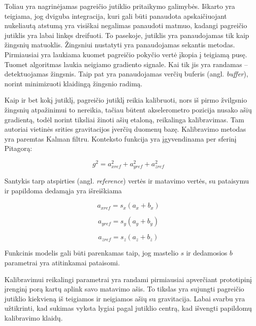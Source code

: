 Toliau yra nagrinėjamas pagreičio jutiklio pritaikymo galimybės. Iškarto yra teigiama, jog dviguba integracija, kuri gali būti panaudota apskaičiuojant nukeliautą atstumą yra visiškai negalimas panaudoti matmuo, kadangi pagreičio jutiklis yra labai linkęs dreifuoti. To pasekoje, jutiklis yra panaudojamas tik kaip žingsnių matuoklis. Žingsniui nustatyti yra panaudojamas sekantis metodas. Pirmiausiai yra laukiama kuomet pagreičio pokyčio vertė įkopia į teigiamą pusę. Tuomet algoritmas laukia neigiamo gradiento signale. Kai tik jis yra randamas -- detektuojamas žingsnis. Taip pat yra panaudojamas verčių buferis (angl. \textit{buffer}), norint minimizuoti klaidingą žingsnio radimą.

Kaip ir bet kokį jutiklį, pagreičio jutiklį reikia kalibruoti, nors iš pirmo žvilgsnio žingsnių atpažinimui to nereikia, tačiau būtent akselerometro pozicija nusako ašių gradientą, todėl norint tiksliai žinoti ašių etaloną, reikalinga kalibravimas. Tam autoriai vietinės srities gravitacijos įverčių duomenų bazę. Kalibravimo metodas yra paremtas \cite{wendel2011integrierte} Kalman filtru. Konteksto funkcija yra įgyvendinama per sferinį Pitagorą:

\begin{equation}
    g^2 = a_{xref}^2 + a_{yref}^2 + a_{zref}^2
\end{equation}

Santykis tarp atspirties (angl. \textit{reference}) vertės ir matavimo vertės, su pataisymu ir papildoma dedamąja yra išreiškiama

\begin{equation}
    a_{xref} = s_x (a_x + b_x)
\end{equation}

\begin{equation}
    a_{yref} = s_y (a_y + b_y)
\end{equation}

\begin{equation}
    a_{zref} = s_z (a_z + b_z)
\end{equation}

Funkcinis modelis gali būti parenkamas taip, jog mastelio $s$ ir dedamosios $b$ parametrai yra atitinkamai pataisomi.

Kalibravimui reikalingi parametrai yra randami pirmiausiai apverčiant prototipinį įrenginį porą kartų aplink savo matavimo ašis. To tikslas yra sujungti pagreičio jutiklio kiekvieną iš teigiamos ir neigiamos ašių su gravitacija. Labai svarbu yra užtikrinti, kad sukimas vyksta lygiai pagal jutiklio centrą, kad išvengti papildomų kalibravimo klaidų.

